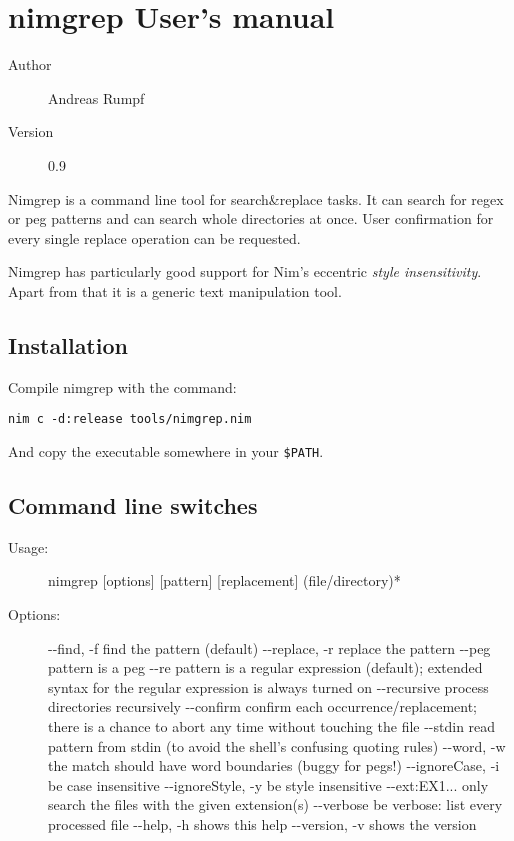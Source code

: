 \hypertarget{nimgrep-users-manual}{%
\section{nimgrep User's manual}\label{nimgrep-users-manual}}

\begin{description}
\item[Author]
Andreas Rumpf
\item[Version]
0.9
\end{description}

Nimgrep is a command line tool for search\&replace tasks. It can search
for regex or peg patterns and can search whole directories at once. User
confirmation for every single replace operation can be requested.

Nimgrep has particularly good support for Nim's eccentric \emph{style
insensitivity}. Apart from that it is a generic text manipulation tool.

\hypertarget{installation}{%
\subsection{Installation}\label{installation}}

Compile nimgrep with the command:

\begin{verbatim}
nim c -d:release tools/nimgrep.nim
\end{verbatim}

And copy the executable somewhere in your \texttt{\$PATH}.

\hypertarget{command-line-switches}{%
\subsection{Command line switches}\label{command-line-switches}}

\begin{description}
\item[Usage:]
nimgrep {[}options{]} {[}pattern{]} {[}replacement{]} (file/directory)*
\item[Options:]
-\/-find, -f find the pattern (default) -\/-replace, -r replace the
pattern -\/-peg pattern is a peg -\/-re pattern is a regular expression
(default); extended syntax for the regular expression is always turned
on -\/-recursive process directories recursively -\/-confirm confirm
each occurrence/replacement; there is a chance to abort any time without
touching the file -\/-stdin read pattern from stdin (to avoid the
shell's confusing quoting rules) -\/-word, -w the match should have word
boundaries (buggy for pegs!) -\/-ignoreCase, -i be case insensitive
-\/-ignoreStyle, -y be style insensitive -\/-ext:EX1... only search the
files with the given extension(s) -\/-verbose be verbose: list every
processed file -\/-help, -h shows this help -\/-version, -v shows the
version
\end{description}
